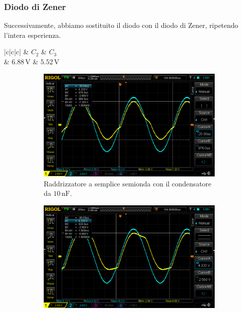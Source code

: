 \documentclass[a4paper]{article}
\begin{document}
{{			\subsubsection{Diodo di Zener}	
				Successivamente, abbiamo sostituito il diodo con il diodo di Zener, ripetendo l'intera esperienza.
				\begin{center}
					\begin{tabular}{ |c|c|c| }
						\hline
						 & \textbf{$ C_{2} $} & \textbf{$ C_{3} $} \\
						\hline
						 & $ 6.88 \, \mathrm{V} $ & $ 5.52 \, \mathrm{V} $ \\
						\hline
					\end{tabular}
				\end{center}
				\begin{figure}[h!]
					\centering
					\begin{subfigure}{0.4\textwidth}
						\centering
						\includegraphics[scale=0.2]{raddrizzatoreASempliceSemiondaDiodoDiZener10n}
						\caption{Raddrizzatore a semplice semionda con il condensatore da $ 10 \, \mathrm{nF} $.}
					\end{subfigure}
					\begin{subfigure}{0.4\textwidth}
						\centering
						\includegraphics[scale=0.2]{raddrizzatoreASempliceSemiondaDiodoDiZener100n}

\end{subfigure}
\end{figure}}}
\end{document}
